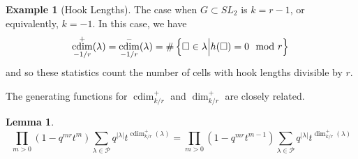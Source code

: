 \documentclass{amsart}[12pt]
\theoremstyle{definition}
\newtheorem{lemma}[dummy]{Lemma}
\newtheorem{example}[dummy]{Example}
\newcommand{\PP}{\mathcal{P}} %
\DeclareMathOperator{\cdim}{cdim}
\begin{document}
\begin{example}[Hook Lengths]
The case when $G\subset SL_2$ is $k=r-1$, or equivalently, $k=-1$.  In this case, we have
$$\cdim^+_{-1/r}(\lambda)=\cdim^-_{-1/r}(\lambda)=\#\left\{\square\in\lambda \Big | h(\square)=0\mod r\right\} \\$$
and so these statistics count the number of cells with hook lengths divisible by $r$.
\end{example}

The generating functions for $\cdim^+_{k/r}$ and $\dim^+_{k/r}$ are closely related.

\begin{lemma}
$$\prod_{m>0}(1-q^{mr}t^m)\sum_{\lambda\in\PP} q^{|\lambda|}t^{\cdim^+_{k/r}(\lambda)}=\prod_{m>0} (1-q^{mr}t^{m-1}) \sum_{\lambda\in\PP} q^{|\lambda|}t^{\dim^+_{k/r}(\lambda)}$$
\end{lemma}
\end{document}
